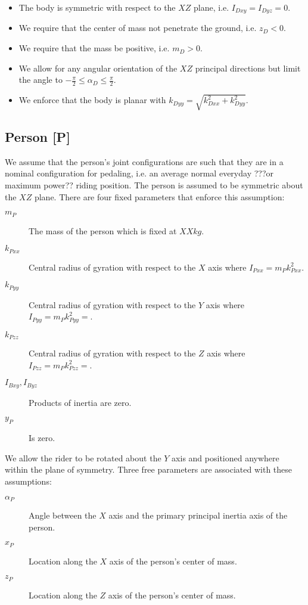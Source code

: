 \documentclass{icsc}
\begin{document}
\begin{itemize}
  \item The body is symmetric with respect to the $XZ$ plane, i.e. $I_{Dxy} = I_{Dyz} = 0$.
  \item We require that the center of mass not penetrate the ground, i.e. $z_D < 0$.
  \item We require that the mass be positive, i.e. $m_D > 0$.
  \item We allow for any angular orientation of the $XZ$ principal directions but limit the angle to $-\frac{\pi}{2} \leq \alpha_D \leq \frac{\pi}{2}$.
  \item We enforce that the body is planar with $k_{Dyy} = \sqrt{k_{Dxx}^2 + k_{Dyy}^2}$.
\end{itemize}

\subsection{Person [P]}

We assume that the person's joint configurations are such that they are in a nominal configuration for pedaling, i.e. an average normal everyday ???or maximum power?? riding position. The person is assumed to be symmetric about the $XZ$ plane. There are four fixed parameters that enforce this assumption: 

\begin{description}
  \item[$m_P$] The mass of the person which is fixed at $XX \si{kg}$.
  \item[$k_{Pxx}$] Central radius of gyration with respect to the $X$ axis where $I_{Pxx} = m_P k_{Pxx}^2$.
  \item[$k_{Pyy}$] Central radius of gyration with respect to the $Y$ axis where $I_{Pyy} = m_P k_{Pyy}^2=$.
  \item[$k_{Pzz}$] Central radius of gyration with respect to the $Z$ axis where $I_{Pzz} = m_P k_{Pzz}^2=$.
  \item[$I_{Bxy}, I_{Byz}$] Products of inertia are zero.
  \item[$y_P$] Is zero.
\end{description}

We allow the rider to be rotated about the $Y$ axis and positioned anywhere within the plane of symmetry. Three free parameters are associated with these assumptions:
  
\begin{description}
  \item[$\alpha_P$] Angle between the $X$ axis and the primary principal inertia axis of the person.
  \item[$x_P$] Location along the $X$ axis of the person's center of mass.
  \item[$z_P$] Location along the $Z$ axis of the person's center of mass.
\end{description}
\end{document}
